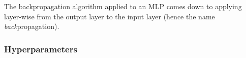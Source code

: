 The backpropagation algorithm applied to an \ac{MLP} comes down to applying  layer-wise from the output layer to the input layer (hence the name \emph{back}propagation).








\subsubsection{Hyperparameters}

